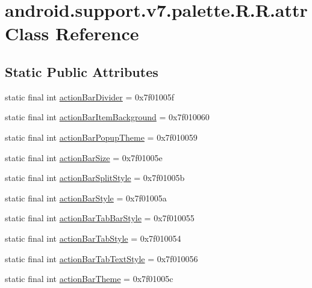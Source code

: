 \hypertarget{classandroid_1_1support_1_1v7_1_1palette_1_1_r_1_1attr}{
\section{android.support.v7.palette.R.R.attr Class Reference}
\label{classandroid_1_1support_1_1v7_1_1palette_1_1_r_1_1attr}
}
\subsection*{Static Public Attributes}
\begin{CompactItemize}
\item 
static final int \hyperlink{classandroid_1_1support_1_1v7_1_1palette_1_1_r_1_1attr_ead98acd46209a3222f530a6061e2f92}{actionBarDivider} = 0x7f01005f
\item 
static final int \hyperlink{classandroid_1_1support_1_1v7_1_1palette_1_1_r_1_1attr_be33ab71c2ea5fa97b8c8c3ba8f2eb8c}{actionBarItemBackground} = 0x7f010060
\item 
static final int \hyperlink{classandroid_1_1support_1_1v7_1_1palette_1_1_r_1_1attr_49aca1cd9c47887a94ad880475a85a20}{actionBarPopupTheme} = 0x7f010059
\item 
static final int \hyperlink{classandroid_1_1support_1_1v7_1_1palette_1_1_r_1_1attr_f9dd00dc96ac7ed024ef6d244a0e1d8d}{actionBarSize} = 0x7f01005e
\item 
static final int \hyperlink{classandroid_1_1support_1_1v7_1_1palette_1_1_r_1_1attr_1f02c5216f70e8b76166320a40fc84b8}{actionBarSplitStyle} = 0x7f01005b
\item 
static final int \hyperlink{classandroid_1_1support_1_1v7_1_1palette_1_1_r_1_1attr_4bf9bd8d5305bde80254d2736feed0c7}{actionBarStyle} = 0x7f01005a
\item 
static final int \hyperlink{classandroid_1_1support_1_1v7_1_1palette_1_1_r_1_1attr_fe78107ea30149c0271dfe15fd4dd212}{actionBarTabBarStyle} = 0x7f010055
\item 
static final int \hyperlink{classandroid_1_1support_1_1v7_1_1palette_1_1_r_1_1attr_8f79fc625bf21b15372f7a2eea8116f9}{actionBarTabStyle} = 0x7f010054
\item 
static final int \hyperlink{classandroid_1_1support_1_1v7_1_1palette_1_1_r_1_1attr_a8965c149bae6aa6029e188ce604c703}{actionBarTabTextStyle} = 0x7f010056
\item 
static final int \hyperlink{classandroid_1_1support_1_1v7_1_1palette_1_1_r_1_1attr_094d506c8e773d089e73dda25166eb87}{actionBarTheme} = 0x7f01005c

\end{CompactItemize}
